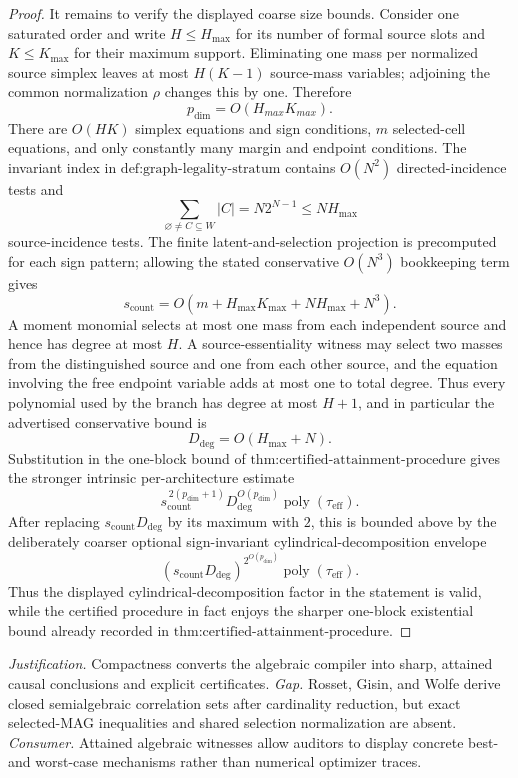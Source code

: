 \documentclass{article}
\begin{document}
\begin{proof}
It remains to verify the displayed coarse size bounds.  Consider one saturated order and write \(H\le H_{\max}\) for its number of formal source slots and \(K\le K_{\max}\) for their maximum support.  Eliminating one mass per normalized source simplex leaves at most \(H(K-1)\) source-mass variables; adjoining the common normalization \(\rho\) changes this by one.  Therefore
\[
 p_{\mathrm{dim}}=O(H_{max}K_{max}).
\]
There are \(O(HK)\) simplex equations and sign conditions, \(m\) selected-cell equations, and only constantly many margin and endpoint conditions.  The invariant index in \(\text{def:graph-legality-stratum}\) contains \(O(N^2)\) directed-incidence tests and
\[
 \sum_{\varnothing\ne C\subseteq W}|C|
 =N2^{N-1}
 \le NH_{\max}
\]
source-incidence tests.  The finite latent-and-selection projection is precomputed for each sign pattern; allowing the stated conservative \(O(N^3)\) bookkeeping term gives
\[
 s_{\mathrm{count}}
 =O\!\left(m+H_{\max}K_{\max}+NH_{\max}+N^3\right).
\]
A moment monomial selects at most one mass from each independent source and hence has degree at most \(H\).  A source-essentiality witness may select two masses from the distinguished source and one from each other source, and the equation involving the free endpoint variable adds at most one to total degree.  Thus every polynomial used by the branch has degree at most \(H+1\), and in particular the advertised conservative bound is
\[
 D_{\mathrm{deg}}=O(H_{\max}+N).
\]
Substitution in the one-block bound of \(\text{thm:certified-attainment-procedure}\) gives the stronger intrinsic per-architecture estimate
\[
 s_{\mathrm{count}}^{\,2(p_{\mathrm{dim}}+1)}
 D_{\mathrm{deg}}^{O(p_{\mathrm{dim}})}
 \operatorname{poly}(\tau_{\mathrm{eff}}).
\]
After replacing \(s_{\mathrm{count}}D_{\mathrm{deg}}\) by its maximum with \(2\), this is bounded above by the deliberately coarser optional sign-invariant cylindrical-decomposition envelope
\[
 (s_{\mathrm{count}}D_{\mathrm{deg}})^{2^{O(p_{\mathrm{dim}})}}
 \operatorname{poly}(\tau_{\mathrm{eff}}).
\]
Thus the displayed cylindrical-decomposition factor in the statement is valid, while the certified procedure in fact enjoys the sharper one-block existential bound already recorded in \(\text{thm:certified-attainment-procedure}\).
\end{proof}
\par\smallskip\noindent \textit{Justification.} Compactness converts the algebraic compiler into sharp, attained causal conclusions and explicit certificates. \textit{Gap.} Rosset, Gisin, and Wolfe derive closed semialgebraic correlation sets after cardinality reduction, but exact selected-MAG inequalities and shared selection normalization are absent. \textit{Consumer.} Attained algebraic witnesses allow auditors to display concrete best- and worst-case mechanisms rather than numerical optimizer traces.
\end{document}
